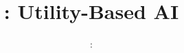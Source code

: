 \usepackage[T1]{fontenc}
\usepackage{../../beamerthemeFalmouthGamesAcademy}
\usepackage{multimedia}
\graphicspath{ {../../} }


\usepackage[normalem]{ulem}
\usepackage{wasysym}

\usepackage{pdfpages}

\usepackage{algpseudocode}

\usetikzlibrary{arrows,automata}

\usepackage{pgfplots}
\pgfplotsset{width=\textwidth,height=0.6\textheight,compat=1.9}




\title{\sessionnumber: Utility-Based AI}
\subtitle{\modulecode: \moduletitle}

\frame{\titlepage} 




